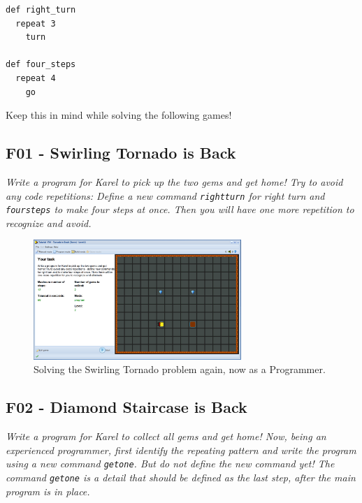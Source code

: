 \documentclass[article,A4,12pt]{llncs}
\begin{document}
{\small
\begin{verbatim}
def right_turn
  repeat 3
    turn

def four_steps
  repeat 4
    go
\end{verbatim}
}
\noindent
Keep this in mind while solving the following games!


\subsection{F01 - Swirling Tornado is Back}

{\em Write a program for Karel to pick up the two gems and get home! Try to 
avoid any code repetitions: Define a new command {\tt rightturn} for right 
turn and {\tt foursteps} to make four steps at once. Then you will have one 
more repetition to recognize and avoid.}

\begin{figure}[!ht]
\begin{center}
\includegraphics[width=0.7\textwidth]{img/f01.png}
\end{center}
\vspace{-4mm}
\caption{Solving the Swirling Tornado problem again, now as a Programmer.}
\label{fig:f01}
\vspace{-10mm}
\end{figure}
\noindent
\newpage


\subsection{F02 - Diamond Staircase is Back}

{\em Write a program for Karel to collect all gems and get home! Now, 
being an experienced programmer, first identify the repeating pattern 
and write the program using a new command {\tt getone}. But do not 
define the new command yet! The command {\tt getone} is a detail that 
should be defined as the last step, after the main program is in place.}
\end{document}
